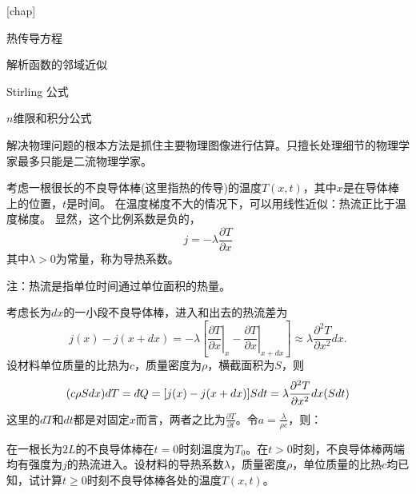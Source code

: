 \documentclass[CJK]{beamer}
\date{}
\begin{document}

[chap]
\def\proid{{Problem \thechap.\theproblem}\ }

\begin{frame}
  \bch
  \bitem
\item{热传导方程}  
\item{解析函数的邻域近似}
\item{Stirling 公式}
\item{$n$维限和积分公式}
  \eitem

  \skiplines

   {\blue 解决物理问题的根本方法是抓住主要物理图像进行估算。只擅长处理细节的物理学家最多只能是二流物理学家。}
  \ech
\end{frame}

\setcounter{chap}{1}
\setcounter{problem}{0}

\begin{frame}
  \bch
  考虑一根很长的不良导体棒(这里指热的传导)的温度$T(x, t)$，其中$x$是在导体棒上的位置，$t$是时间。
  在温度梯度不大的情况下，可以用线性近似：{\blue 热流正比于温度梯度}。
  显然，这个比例系数是负的，
  $$ j =  -\lambda \frac{\partial T}{\partial x} $$
  其中$\lambda >0$为常量，称为{\blue 导热系数}。


  {\small 注：热流是指单位时间通过单位面积的热量。}
  \ech
\end{frame}


\begin{frame}
  \bch

{\small
  考虑长为$dx$的一小段不良导体棒，进入和出去的热流差为
  $$j(x)-j(x+dx) = -\lambda \left[\left.\frac{\partial T}{\partial x}\right\vert_{x}-\left.\frac{\partial T}{\partial x}\right\vert_{x+dx}\right]\approx \lambda \frac{\partial^2 T}{\partial x^2} dx. $$
  设材料单位质量的比热为$c$，质量密度为$\rho$，横截面积为$S$，则
  $$ (c \rho S dx) dT = \dbar Q = [j(x)-j(x+dx)] S dt =  \lambda \frac{\partial^2 T}{\partial x^2} dx  (S dt) $$
  这里的$dT$和$dt$都是对固定$x$而言，两者之比为$\frac{\partial T}{\partial t}$。令$a = \frac{\lambda}{\rho c}$，则：

  }
  \ech
\end{frame}

\begin{frame}
  \chtitle{\proid (\sthree)}
  \bch
  
  在一根长为$2L$的不良导体棒在$t=0$时刻温度为$T_0$。在$t>0$时刻，不良导体棒两端均有强度为$j$的热流进入。设材料的导热系数$\lambda$，质量密度$\rho$，单位质量的比热$c$均已知，试计算$t\ge 0$时刻不良导体棒各处的温度$T(x,t)$。
  \ech
\end{frame}
\end{document}
